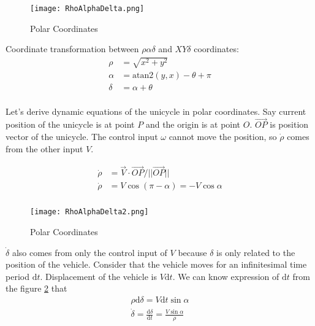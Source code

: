 \documentclass[twoside]{article}
\begin{document}
\begin{figure}[h]
\centering
\texttt{[image: RhoAlphaDelta.png]}
\caption{Polar Coordinates}
\label{RhoAlphaDeltaFigure}
\end{figure}

Coordinate transformation between $\rho\alpha\delta$ and $XY\delta$ coordinates:
\begin{equation} \label{coordinate transformation}
\begin{split}
\rho &= \sqrt{x^2+y^2} \\
\alpha &= \mathrm{atan2}(y, x) - \theta + \pi \\
\delta &= \alpha + \theta \\
\end{split}
\end{equation}

Let's derive dynamic equations of the unicycle in polar coordinates. Say current position of the unicycle is at point $P$ and the origin is at point $O$. $\overrightarrow{OP}$ is position vector of the unicycle. The control input $\omega$ cannot move the position, so $\dot{\rho}$ comes from the other input $V$.

\begin{equation} \label{dotrho}
\begin{split}
\dot{\rho} &= \vec{V} \cdot \overrightarrow{OP}/||\overrightarrow{OP}|| \\
\dot{\rho} &= V \cos(\pi - \alpha) = -V \cos\alpha \\
\end{split}
\end{equation}

\begin{figure}[h]
\centering
\texttt{[image: RhoAlphaDelta2.png]}
\caption{Polar Coordinates}
\label{RhoAlphaDeltaFigure2}
\end{figure}

$\dot{\delta}$ also comes from only the control input of $V$ because $\delta$ is only related to the position of the vehicle. Consider that the vehicle moves for an infinitesimal time period $\mathrm{d}t$. Displacement of the vehicle is $V\mathrm{d}t$. We can know expression of $\mathrm{d}t$ from the figure \ref{RhoAlphaDeltaFigure2} that
\begin{equation} \label{dotdelta}
\begin{split}
\rho \mathrm{d}\delta = V \mathrm{d}t \sin\alpha \\
\dot{\delta} = \frac{\mathrm{d}\delta}{\mathrm{d}t}=\frac{V \sin\alpha}{\rho}  \\
\end{split}
\end{equation}
\end{document}
